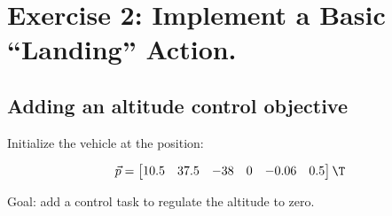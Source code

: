 	\section{Exercise 2: Implement a Basic “Landing” Action.}
	\subsection{Adding an
	altitude control objective}
	\question
	Initialize the vehicle at the position:

	\begin{displaymath}
		\vec{p}
		=
		\begin{bmatrix}
			10.5 & 37.5 & -38 & 0 & -0.06 & 0.5
		\end{bmatrix}\T
	\end{displaymath}

	Goal: add a control task to regulate the altitude to zero.
